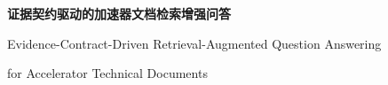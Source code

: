 \documentclass[UTF8,fontset=none,zihao=5,a4paper]{ctexart}
\begin{document}
\begin{center}
{\LARGE\bfseries 证据契约驱动的加速器文档检索增强问答\par}\vspace{4pt}
{\normalsize Evidence-Contract-Driven Retrieval-Augmented Question Answering\par for Accelerator Technical Documents}
\end{center}









\FloatBarrier\label{maintext-end}\clearpage
\begingroup\small{}\setlength{\bibsep}{2pt}\endgroup
\clearpage\appendix
\end{document}
